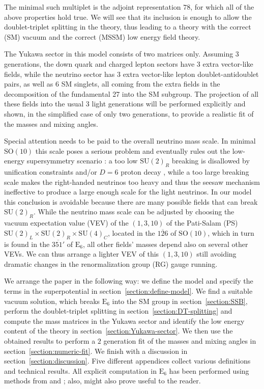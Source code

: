 \documentclass[a4paper,12pt]{article}
\def\SU{\mathrm{SU}}
\def\SO{\mathrm{SO}}
\def\EE{\mathrm{E}_6}
\begin{document}
The minimal such multiplet is the adjoint representation $78$, for which all of the above properties hold true. We will see that its inclusion is enough to allow the doublet-triplet splitting in the theory,
thus leading to a theory with the correct (SM) vacuum and the correct (MSSM) low energy field theory.

The Yukawa sector in this model consists of two matrices only. Assuming 3 generations, the down quark and charged lepton sectors
have 3 extra vector-like fields, while the neutrino sector has 3 extra vector-like lepton doublet-antidoublet pairs, as well
as 6 SM singlets, all coming from the extra fields in the decomposition of the fundamental 27 into the SM subgroup. The
projection of all these fields into the usual 3 light generations will be performed explicitly and shown, in the simplified case
of only two generations, to provide a realistic fit of the masses and mixing angles.

Special attention needs to be paid to the overall neutrino mass scale. In minimal $\SO(10)$ \cite{Clark:1982ai,Aulakh:1982sw,Aulakh:2003kg}
this scale poses a serious problem and eventually rules out the low-energy supersymmetry scenario
\cite{Aulakh:2005bd,Bajc:2005qe,Aulakh:2005mw,Bertolini:2006pe}: a too low $\SU(2)_R$ breaking is disallowed by
unification constraints and/or $D=6$ proton decay \cite{Bajc:2008dc}, while a too large  breaking scale makes
the right-handed neutrinos too heavy and thus
the seesaw mechanism ineffective to produce a large enough scale for the light neutrinos. In our model this conclusion is avoidable
because there are many possible fields that can break $\SU(2)_R$. While the neutrino mass scale can be adjusted by choosing the vacuum expectation value (VEV) of the $(1,3,10)$ of the Pati-Salam (PS) $\SU(2)_L\times\SU(2)_R\times\SU(4)_C$, located in the $\overline{126}$ of $\SO(10)$, which in turn is found in the $\overline{351'}$ of $\EE$, all other fields' masses depend also on several other VEVs. We can thus arrange a lighter VEV of this $(1,3,10)$
still avoiding dramatic changes in the renormalization group (RG) gauge running.

We arrange the paper in the following way: we define the model and specify the terms in the superpotential in section~\ref{section:define-model}. We find a suitable vacuum solution, which breaks $\EE$ into the SM group in section~\ref{section:SSB}, perform the doublet-triplet splitting in section~\ref{section:DT-splitting} and compute the mass matrices in the Yukawa sector and identify the low energy content of the theory in section~\ref{section:Yukawa-sector}. We then use the obtained results to perform a $2$ generation fit of the masses and mixing angles in section~\ref{section:numeric-fit}. We finish with a discussion in section~\ref{section:discussion}. Five different appendices collect various definitions and
technical results. All explicit computation in $\EE$ has been performed using methods from \cite{Kephart:1981gf} and \cite{Bajc:2013qra}; also, \cite{Anderson:1999em,Anderson:2000ni,Anderson:2001sd} might also prove useful to the reader.
\end{document}

